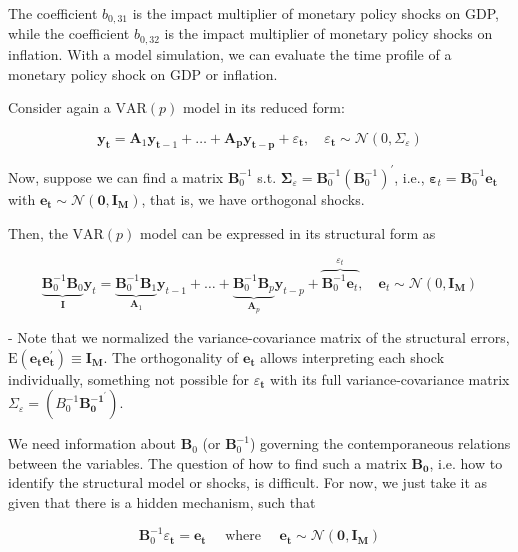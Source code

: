 The coefficient $b_{0,31}$ is the impact multiplier of monetary policy shocks on GDP, while the coefficient $b_{0,32}$ is the impact multiplier of monetary policy shocks on inflation. With a model simulation, we can evaluate the time profile of a monetary policy shock on GDP or inflation. 

Consider again a $\mathrm{VAR}(p)$ model in its reduced form:

\[
\bm{y}_{\bm{t}}=\bm{A}_1 \bm{y}_{\bm{t}-1}+\ldots+\bm{A}_{\bm{p}} \bm{y}_{\bm{t}-\bm{p}}+\varepsilon_{\bm{t}}, \quad \varepsilon_{\bm{t}} \sim \mathcal{N}\left(0, \Sigma_{\varepsilon}\right)
\]

Now, suppose we can find a matrix $\bm{B}_0^{-1}$ s.t. $\bm{\Sigma}_{\varepsilon}=\bm{B}_0^{-1}\left(\bm{B}_0^{-1}\right)^{\prime}$, i.e., $\bm{\varepsilon}_t=\bm{B}_0^{-1} \bm{e}_{\bm{t}}$ with $\bm{e}_{\bm{t}} \sim \mathcal{N}\left(\bm{0}, \bm{I}_{\bm{M}}\right)$, that is, we have orthogonal shocks.

Then, the $\mathrm{VAR}(p)$ model can be expressed in its structural form as

\begin{equation}
\underbrace{\bm{B}_0^{-1} \bm{B}_0}_{\bm{I}} \bm{y}_t=\underbrace{\bm{B}_0^{-1} \bm{B}_1}_{\bm{A}_1} \bm{y}_{t-1}+\ldots+\underbrace{\bm{B}_0^{-1} \bm{B}_p}_{\bm{A}_p} \bm{y}_{t-p}+\overbrace{\bm{B}_0^{-1} \bm{e}_t}^{\varepsilon_t}, \quad \bm{e}_t \sim \mathcal{N}\left(0, \bm{I}_{\bm{M}}\right)
\end{equation}

- Note that we normalized the variance-covariance matrix of the structural errors, $\mathrm{E}\left(\bm{e}_{\bm{t}} \bm{e}_{\bm{t}}^{\prime}\right) \equiv \bm{I}_{\bm{M}}$. The orthogonality of $\bm{e}_{\bm{t}}$ allows interpreting each shock individually, something not possible for $\varepsilon_{\bm{t}}$ with its full variance-covariance matrix $\Sigma_{\varepsilon}=\left(B_0^{-1} \bm{B}_{\bm{0}}^{-\bm{1}^{\prime}}\right)$.

We need information about $\bm{B}_0$ (or $\bm{B}_0^{-1}$) governing the contemporaneous relations between the variables. The question of how to find such a matrix $\bm{B}_{\bm{0}}$, i.e. how to identify the structural model or shocks, is difficult. For now, we just take it as given that there is a hidden mechanism, such that

\[
\bm{B}_0^{-1} \varepsilon_{\bm{t}}=\bm{e}_{\bm{t}} \quad \text { where } \quad \bm{e}_{\bm{t}} \sim \mathcal{N}\left(\bm{0}, \bm{I}_{\bm{M}}\right)
\]


